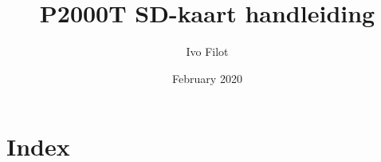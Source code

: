\documentclass[11pt,fleqn,twoside,openright]{extbook}
\title{P2000T SD-kaart handleiding}
\author{Ivo Filot}
\date{February 2020}
\begin{document}
\frontmatter

\cleardoublepage
\dominitoc
\tableofcontents

\mainmatter





\appendix
\renewcommand\chaptername{Appendix }



\chapter{Index}
\pagecolor{primarycol}\afterpage{\nopagecolor}
\printindex
\end{document}
